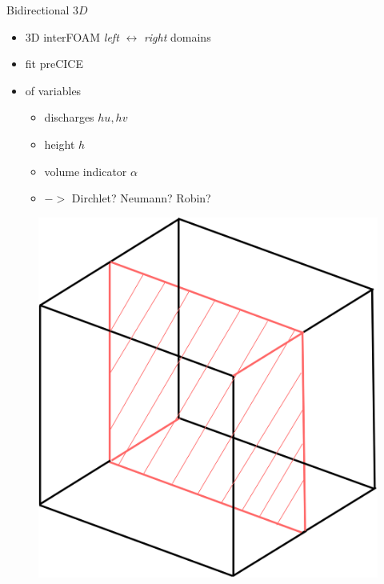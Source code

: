 \begin{frame}
\vspace{-2mm}
{\large Bidirectional $3D$}\\
\begin{multicols}{2}
\begin{itemize}
\setlength\itemsep{2em}
\item 3D interFOAM  \textit{left} $\leftrightarrow$ \textit{right} domains
\item fit  preCICE
\item {} of variables
\begin{itemize}
\setlength\itemsep{1em}
\vspace{5pt}
\item discharges $hu, hv$
\item height $h$
\item volume indicator $\alpha$
\item {} $->$ Dirchlet? Neumann? Robin?
\end{itemize}
\end{itemize}

\vfill\columnbreak

\begin{figure}
\includegraphics[scale=0.5]{./Resources/Images/mapping33.png}
\end{figure}

\end{multicols}

\end{frame}



